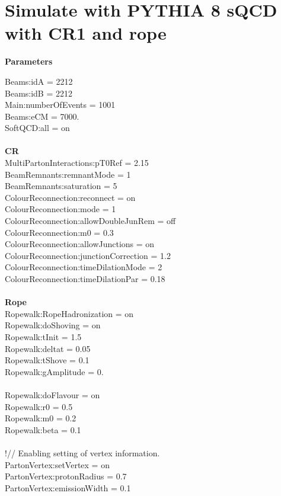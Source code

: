 
\section{Simulate with PYTHIA 8 sQCD with CR1 and rope}%
\label{sec:Parameter}


\textbf{Parameters}

Beams:idA = 2212
\\Beams:idB = 2212
\\Main:numberOfEvents = 1001
\\Beams:eCM = 7000.
\\SoftQCD:all = on
\\
\\\textbf{CR}
\\MultiPartonInteractions:pT0Ref = 2.15
\\BeamRemnants:remnantMode = 1
\\BeamRemnants:saturation = 5
\\ColourReconnection:reconnect = on
\\ColourReconnection:mode = 1
\\ColourReconnection:allowDoubleJunRem = off
\\ColourReconnection:m0 = 0.3
\\ColourReconnection:allowJunctions = on
\\ColourReconnection:junctionCorrection = 1.2
\\ColourReconnection:timeDilationMode = 2
\\ColourReconnection:timeDilationPar = 0.18
\\
\\\textbf{Rope}
\\Ropewalk:RopeHadronization = on
\\Ropewalk:doShoving = on
\\Ropewalk:tInit = 1.5 %
\\Ropewalk:deltat = 0.05
\\Ropewalk:tShove = 0.1
\\Ropewalk:gAmplitude = 0. %
\\
\\Ropewalk:doFlavour = on
\\Ropewalk:r0 = 0.5
\\Ropewalk:m0 = 0.2
\\Ropewalk:beta = 0.1
\\
\\!// Enabling setting of vertex information.
\\PartonVertex:setVertex = on
\\PartonVertex:protonRadius = 0.7
\\PartonVertex:emissionWidth = 0.1


